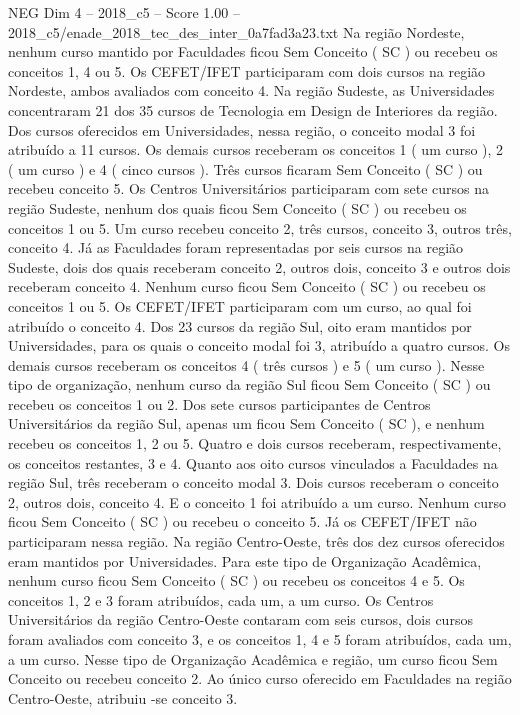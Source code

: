 \begin{textsample}{NEG Dim 4 – 2018\_c5 – Score 1.00 – 2018\_c5/enade\_2018\_tec\_des\_inter\_0a7fad3a23.txt}
Na região Nordeste, nenhum curso mantido por Faculdades ficou Sem Conceito ( SC ) ou recebeu os conceitos 1, 4 ou 5.
Os CEFET/IFET participaram com dois cursos na região Nordeste, ambos avaliados com conceito 4.
Na região Sudeste, as Universidades concentraram 21 dos 35 cursos de Tecnologia em Design de Interiores da região.
Dos cursos oferecidos em Universidades, nessa região, o conceito modal 3 foi atribuído a 11 cursos.
Os demais cursos receberam os conceitos 1 ( um curso ), 2 ( um curso ) e 4 ( cinco cursos ).
Três cursos ficaram Sem Conceito ( SC ) ou recebeu conceito 5.
Os Centros Universitários participaram com sete cursos na região Sudeste, nenhum dos quais ficou Sem Conceito ( SC ) ou recebeu os conceitos 1 ou 5.
Um curso recebeu conceito 2, três cursos, conceito 3, outros três, conceito 4.
Já as Faculdades foram representadas por seis cursos na região Sudeste, dois dos quais receberam conceito 2, outros dois, conceito 3 e outros dois receberam conceito 4.
Nenhum curso ficou Sem Conceito ( SC ) ou recebeu os conceitos 1 ou 5.
Os CEFET/IFET participaram com um curso, ao qual foi atribuído o conceito 4.
Dos 23 cursos da região Sul, oito eram mantidos por Universidades, para os quais o conceito modal foi 3, atribuído a quatro cursos.
Os demais cursos receberam os conceitos 4 ( três cursos ) e 5 ( um curso ).
Nesse tipo de organização, nenhum curso da região Sul ficou Sem Conceito ( SC ) ou recebeu os conceitos 1 ou 2.
Dos sete cursos participantes de Centros Universitários da região Sul, apenas um ficou Sem Conceito ( SC ), e nenhum recebeu os conceitos 1, 2 ou 5.
Quatro e dois cursos receberam, respectivamente, os conceitos restantes, 3 e 4.
Quanto aos oito cursos vinculados a Faculdades na região Sul, três receberam o conceito modal 3.
Dois cursos receberam o conceito 2, outros dois, conceito 4.
E o conceito 1 foi atribuído a um curso.
Nenhum curso ficou Sem Conceito ( SC ) ou recebeu o conceito 5.
Já os CEFET/IFET não participaram nessa região.
Na região Centro-Oeste, três dos dez cursos oferecidos eram mantidos por Universidades.
Para este tipo de Organização Acadêmica, nenhum curso ficou Sem Conceito ( SC ) ou recebeu os conceitos 4 e 5.
Os conceitos 1, 2 e 3 foram atribuídos, cada um, a um curso.
Os Centros Universitários da região Centro-Oeste contaram com seis cursos, dois cursos foram avaliados com conceito 3, e os conceitos 1, 4 e 5 foram atribuídos, cada um, a um curso.
Nesse tipo de Organização Acadêmica e região, um curso ficou Sem Conceito ou recebeu conceito 2.
Ao único curso oferecido em Faculdades na região Centro-Oeste, atribuiu -se conceito 3.

\end{textsample}
